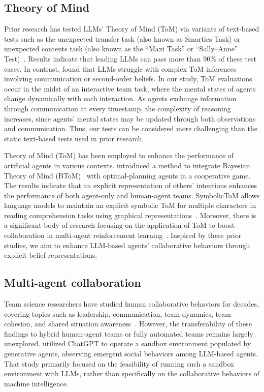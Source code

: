 \documentclass[11pt]{article}
\begin{document}
\subsection{Theory of Mind}
Prior research has tested LLMs' Theory of Mind (ToM) via variants of text-based tests such as the unexpected transfer task (also known as Smarties Task) or unexpected contents task (also known as the “Maxi Task” or “Sally–Anne” Test)~\cite{kosinski2023theory,moghaddam2023boosting}. Results indicate that leading LLMs can pass more than 90\% of these test cases. In contrast, \citet{ullman2023large} found that LLMs struggle with complex ToM inferences involving communication or second-order beliefs. In our study, ToM evaluations occur in the midst of an interactive team task, where the mental states of agents change dynamically with each interaction. As agents exchange information through communication at every timestamp, the complexity of reasoning increases, since agents' mental states may be updated through both observations and communication. Thus, our tests can be considered more challenging than the static text-based tests used in prior research.


Theory of Mind (ToM) has been employed to enhance the performance of artificial agents in various contexts. \citet{lim2020improving} introduced a method to integrate Bayesian Theory of Mind (BToM)~\cite{baker2017rational} with optimal-planning agents in a cooperative game. The results indicate that an explicit representation of others' intentions enhances the performance of both agent-only and human-agent teams. SymbolicToM allows language models to maintain an explicit symbolic ToM for multiple characters in reading comprehension tasks using graphical representations~\cite{sclar2023minding}. Moreover, there is a significant body of research focusing on the application of ToM to boost collaboration in multi-agent reinforcement learning~\cite{oguntola2023theory,yuan2021emergence}. Inspired by these prior studies, we aim to enhance LLM-based agents' collaborative behaviors through explicit belief representations.


\subsection{Multi-agent collaboration}
Team science researchers have studied human collaborative behaviors for decades, covering topics such as leadership, communication, team dynamics, team cohesion, and shared situation awareness~\cite{riedl2021quantifying}. However, the transferability of these findings to hybrid human-agent teams or fully automated teams remains largely unexplored. \citet{park2023generative} utilized ChatGPT to operate a sandbox environment populated by generative agents, observing emergent social behaviors among LLM-based agents. That study primarily focused on the feasibility of running such a sandbox environment with LLMs, rather than specifically on the collaborative behaviors of machine intelligence.
\end{document}
